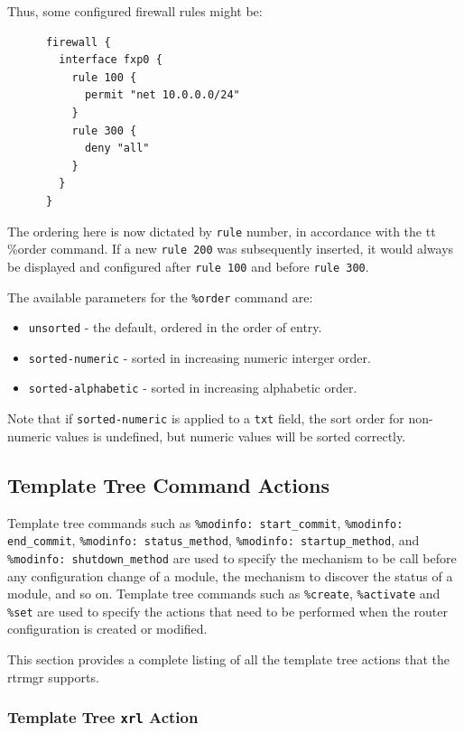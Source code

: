 \documentclass[11pt]{article}
\begin{document}
\noindent Thus, some configured firewall rules might be:
\begin{verbatim}
      firewall {
        interface fxp0 {
          rule 100 {
            permit "net 10.0.0.0/24"
          }
          rule 300 {
            deny "all"
          }
        }
      }
\end{verbatim}

\noindent The ordering here is now dictated by {\tt rule} number, in accordance
with the {tt \%order} command.  If a new {\tt rule 200} was
subsequently inserted, it would always be displayed and configured
after {\tt rule 100} and before {\tt rule 300}.

\noindent The available parameters for the {\tt \%order} command are:
\begin{itemize}
\item {\tt unsorted} - the default, ordered in the order of entry.
\item {\tt sorted-numeric} - sorted in increasing numeric interger
  order.
\item {\tt sorted-alphabetic} - sorted in increasing alphabetic order.
\end{itemize}

\noindent Note that if {\tt sorted-numeric} is applied to a {\tt txt}
field, the sort order for non-numeric values is undefined, but numeric
values will be sorted correctly.

\newpage

\subsection{Template Tree Command Actions}

Template tree commands such as {\tt \%modinfo: start\_commit},
{\tt \%modinfo: end\_commit}, {\tt \%modinfo: status\_method},
{\tt \%modinfo: startup\_method}, and {\tt \%modinfo: shutdown\_method}
are used to specify the mechanism to be call before any configuration
change of a module, the mechanism to discover the status of a module, and so
on.
Template tree commands such as {\tt \%create}, {\tt \%activate} and
{\tt \%set} are used to specify the actions that need to be performed
when the router configuration is created or modified.

This section provides a complete listing of all the template tree
actions that the rtrmgr supports.

\subsubsection{Template Tree {\tt xrl} Action}
\end{document}
